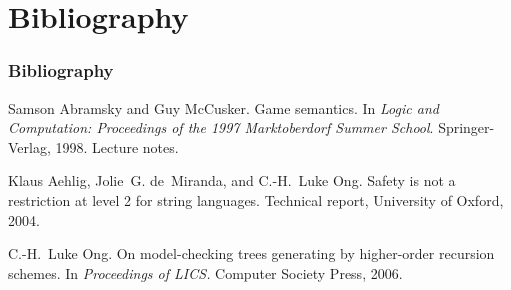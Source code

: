 \section{Bibliography}
\begin{frame} \frametitle<presentation>{Bibliography}

  \begin{thebibliography}{10}
  \beamertemplatearticlebibitems
    Samson Abramsky and Guy McCusker.
    \newblock Game semantics.
    \newblock In {\em Logic and Computation: Proceedings of the 1997 Marktoberdorf
      Summer School}. Springer-Verlag, 1998.
    \newblock Lecture notes.

    Klaus Aehlig, Jolie~G. de~Miranda, and C.-H.~Luke Ong.
    \newblock Safety is not a restriction at level 2 for string languages.
    \newblock Technical report, University of Oxford, 2004.

    C.-H.~Luke Ong.
    \newblock On model-checking trees generating by higher-order recursion schemes.
    \newblock In {\em Proceedings of LICS.} Computer Society Press, 2006.
  \end{thebibliography}
\end{frame}



